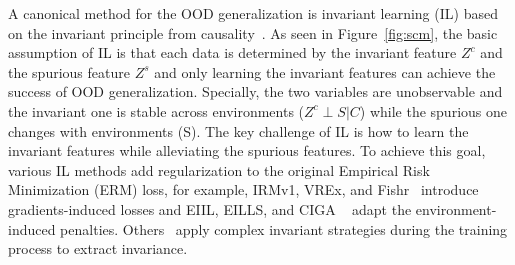 A canonical method for the OOD generalization is invariant learning (IL) based on the invariant principle from causality~\citep{irmv1,ib-irm,inv_principle,v-rex,yao2024empowering,chen2024interpretable,wang2024sober,xu2025brainood}.
As seen in Figure~\ref{fig:scm}, the basic assumption of IL is that each data is determined by the invariant feature $Z^c$ and the spurious feature $Z^s$ and only learning the invariant features can achieve the success of OOD generalization. 
Specially, the two variables are unobservable and the invariant one is stable across environments ($Z^c\perp S | C $) while the spurious one changes with environments (S).
The key challenge of IL is how to learn the invariant features while alleviating the spurious features.
To achieve this goal, various IL methods add regularization to the original Empirical Risk Minimization (ERM) loss, 
for example, IRMv1, VREx, and Fishr~\citep{v-rex,fishr} introduce gradients-induced losses and EIIL, EILLS, and CIGA ~\citep{eiil,Fan2023EnvironmentIL,ciga} adapt the environment-induced penalties.
Others~\citep{inv_principle,ib-irm,dir,groupdro} apply complex invariant strategies during the training process to extract invariance.

